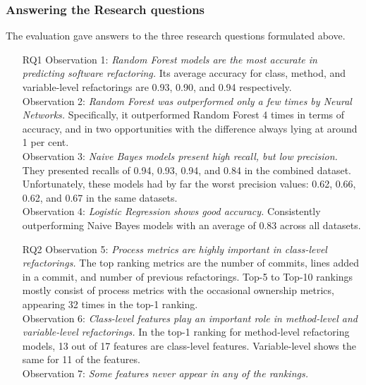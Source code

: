 \subsubsection{Answering the Research questions}
The evaluation gave answers to the three research questions formulated above. 
\begin{itemize}
    \item[RQ1] Observation 1: \textit{Random Forest models are the most accurate in predicting software refactoring.} Its average accuracy for class, method, and variable-level refactorings are 0.93, 0.90, and 0.94 respectively.\\Observation 2: \textit{Random Forest was outperformed only a few times by Neural Networks.} Specifically, it outperformed Random Forest 4 times in terms of accuracy, and in two opportunities with the difference always lying at around 1 per cent. \\ Observation 3: \textit{Naive Bayes models present high recall, but low precision.} They presented recalls of 0.94, 0.93, 0.94, and 0.84 in the combined dataset. Unfortunately, these models had by far the worst precision values: 0.62, 0.66, 0.62, and 0.67 in the same datasets. \\ Observation 4: \textit{Logistic Regression shows good accuracy.} Consistently outperforming Naive Bayes models with an average of 0.83 across all datasets. 
    \item[RQ2] Observation 5: \textit{Process metrics are highly important in class-level refactorings.} The top ranking metrics are the number of commits, lines added in a commit, and number of previous refactorings. Top-5 to Top-10 rankings mostly consist of process metrics with the occasional ownership metrics, appearing 32 times in the top-1 ranking. \\ Observation 6: \textit{Class-level features play an important role in method-level and variable-level refactorings.} In the top-1 ranking for method-level refactoring models, 13 out of 17 features are class-level features. Variable-level shows the same for 11 of the features. \\ Observation 7: \textit{Some features never appear in any of the rankings.}

\end{itemize}
